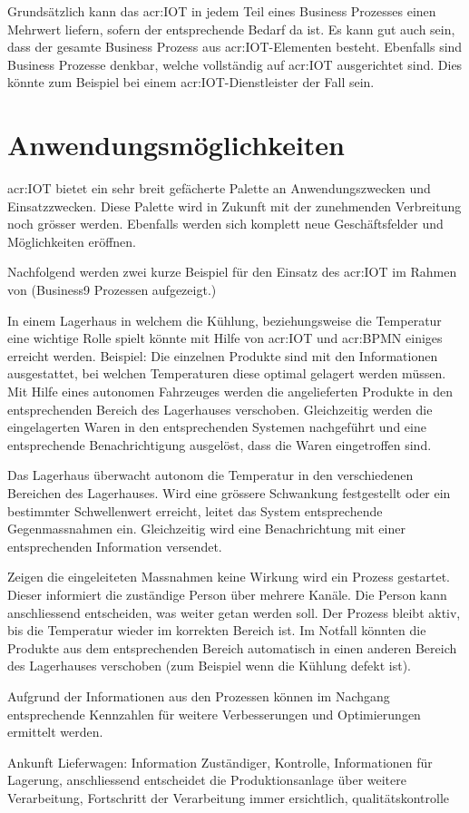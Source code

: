 Grundsätzlich kann das \gls{acr:IOT} in jedem Teil eines Business Prozesses einen Mehrwert liefern, sofern der entsprechende Bedarf da ist. Es kann gut auch sein, dass der gesamte Business Prozess aus \gls{acr:IOT}-Elementen besteht. Ebenfalls sind Business Prozesse denkbar, welche vollständig auf \gls{acr:IOT} ausgerichtet sind. Dies könnte zum Beispiel bei einem \gls{acr:IOT}-Dienstleister der Fall sein.


\section{Anwendungsmöglichkeiten}
\gls{acr:IOT} bietet ein sehr breit gefächerte Palette an Anwendungszwecken und Einsatzzwecken. Diese Palette wird in Zukunft mit der zunehmenden Verbreitung noch grösser werden. Ebenfalls werden sich komplett neue Geschäftsfelder und Möglichkeiten eröffnen.

Nachfolgend werden zwei kurze Beispiel für den Einsatz des \gls{acr:IOT} im Rahmen von (Business9 Prozessen aufgezeigt.)

\begin{itemize}
{In einem Lagerhaus in welchem die Kühlung, beziehungsweise die Temperatur eine wichtige Rolle spielt könnte mit Hilfe von \gls{acr:IOT} und \gls{acr:BPMN} einiges erreicht werden. Beispiel: Die einzelnen Produkte sind mit den Informationen ausgestattet, bei welchen Temperaturen diese optimal gelagert werden müssen. Mit Hilfe eines autonomen Fahrzeuges werden die angelieferten Produkte in den entsprechenden Bereich des Lagerhauses verschoben. Gleichzeitig werden die eingelagerten Waren in den entsprechenden Systemen nachgeführt und eine entsprechende Benachrichtigung ausgelöst, dass die Waren eingetroffen sind.

Das Lagerhaus überwacht autonom die Temperatur in den verschiedenen Bereichen des Lagerhauses. Wird eine grössere Schwankung festgestellt oder ein bestimmter Schwellenwert erreicht, leitet das System entsprechende Gegenmassnahmen ein. Gleichzeitig wird eine Benachrichtung mit einer entsprechenden Information versendet.

Zeigen die eingeleiteten Massnahmen keine Wirkung wird ein Prozess gestartet. Dieser informiert die zuständige Person über mehrere Kanäle. Die Person kann anschliessend entscheiden, was weiter getan werden soll. Der Prozess bleibt aktiv, bis die Temperatur wieder im korrekten Bereich ist. Im Notfall könnten die Produkte aus dem entsprechenden Bereich automatisch in einen anderen Bereich des Lagerhauses verschoben (zum Beispiel wenn die Kühlung defekt ist). 

Aufgrund der Informationen aus den Prozessen können im Nachgang entsprechende Kennzahlen für weitere Verbesserungen und Optimierungen ermittelt werden.}


{Ankunft Lieferwagen: Information Zuständiger, Kontrolle, Informationen für Lagerung, anschliessend entscheidet die Produktionsanlage über weitere Verarbeitung, Fortschritt der Verarbeitung immer ersichtlich, qualitätskontrolle}

\end{itemize}


